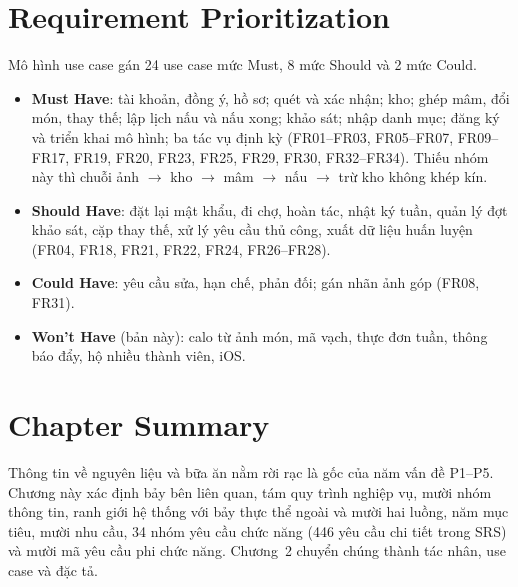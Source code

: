 \section{Requirement Prioritization}
Mô hình use case gán 24 use case mức Must, 8 mức Should và 2 mức Could.
\begin{itemize}
\item \textbf{Must Have}: tài khoản, đồng ý, hồ sơ; quét và xác nhận; kho; ghép mâm, đổi món, thay thế; lập lịch nấu và nấu xong; khảo sát; nhập danh mục; đăng ký và triển khai mô hình; ba tác vụ định kỳ (FR01--FR03, FR05--FR07, FR09--FR17, FR19, FR20, FR23, FR25, FR29, FR30, FR32--FR34). Thiếu nhóm này thì chuỗi ảnh $\rightarrow$ kho $\rightarrow$ mâm $\rightarrow$ nấu $\rightarrow$ trừ kho không khép kín.
\item \textbf{Should Have}: đặt lại mật khẩu, đi chợ, hoàn tác, nhật ký tuần, quản lý đợt khảo sát, cặp thay thế, xử lý yêu cầu thủ công, xuất dữ liệu huấn luyện (FR04, FR18, FR21, FR22, FR24, FR26--FR28).
\item \textbf{Could Have}: yêu cầu sửa, hạn chế, phản đối; gán nhãn ảnh góp (FR08, FR31).
\item \textbf{Won't Have} (bản này): calo từ ảnh món, mã vạch, thực đơn tuần, thông báo đẩy, hộ nhiều thành viên, iOS.
\end{itemize}

\section{Chapter Summary}
Thông tin về nguyên liệu và bữa ăn nằm rời rạc là gốc của năm vấn đề P1--P5. Chương này xác định bảy bên liên quan, tám quy trình nghiệp vụ, mười nhóm thông tin, ranh giới hệ thống với bảy thực thể ngoài và mười hai luồng, năm mục tiêu, mười nhu cầu, 34 nhóm yêu cầu chức năng (446 yêu cầu chi tiết trong SRS) và mười mã yêu cầu phi chức năng. Chương~2 chuyển chúng thành tác nhân, use case và đặc tả.
